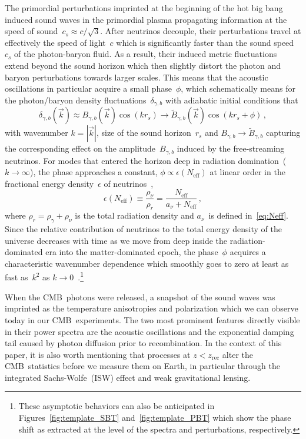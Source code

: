 \documentclass[11pt]{article}
\numberwithin{equation}{section}
\newcommand{\Neff}{N_\mathrm{eff}}
\begin{document}
The primordial perturbations imprinted at the beginning of the hot big bang induced sound waves in the primordial plasma propagating information at the speed of sound~$c_s \approx c/\sqrt{3}$. After neutrinos decouple, their perturbations travel at effectively the speed of light~$c$ which is significantly faster than the sound speed~$c_s$ of the photon-baryon fluid. As a result, their induced metric fluctuations extend beyond the sound horizon which then slightly distort the photon and baryon perturbations towards larger scales. This means that the acoustic oscillations in particular acquire a small phase~$\phi$, which schematically means for the photon/baryon density fluctuations~$\delta_{\gamma,b}$ with adiabatic initial conditions that
\begin{equation}
	\delta_{\gamma,b}(\vec{k}) \approx B_{\gamma,b}(\vec{k}) \cos(k r_s) \to \tilde{B}_{\gamma,b}(\vec{k}) \cos(k r_s + \phi)\, ,
\end{equation}
with wavenumber $k = |\vec{k}|$, size of the sound horizon~$r_s$ and $B_{\gamma,b} \to \tilde{B}_{\gamma,b}$ capturing the corresponding effect on the amplitude~$B_{\gamma,b}$ induced by the free-streaming neutrinos. For modes that entered the horizon deep in radiation domination~($k \to \infty$), the phase approaches a constant, $\phi \propto \epsilon(\Neff)$ at linear order in the fractional energy density~$\epsilon$ of neutrinos~\cite{Bashinsky:2003tk, Baumann:2015rya},
\begin{equation}
	\epsilon(\Neff) \equiv \frac{\rho_\nu}{\rho_r} = \frac{\Neff}{a_\nu + \Neff} \, ,	\label{eq:fractional_density}
\end{equation}
where $\rho_r = \rho_\gamma + \rho_\nu$ is the total radiation density and $a_\nu$~is defined in~\eqref{eq:Neff}. Since the relative contribution of neutrinos to the total energy density of the universe decreases with time as we move from deep inside the radiation-dominated era into the matter-dominated epoch, the phase~$\phi$ acquires a characteristic wavenumber dependence which smoothly goes to zero at least as fast as~$k^2$ as $k \to 0$~\cite{Baumann:2015rya}.\footnote{These asymptotic behaviors can also be anticipated in Figures~\ref{fig:template_SBT} and~\ref{fig:template_PBT} which show the phase shift as extracted at the level of the spectra and perturbations, respectively.}\medskip

When the CMB~photons were released, a snapshot of the sound waves was imprinted as the temperature anisotropies and polarization which we can observe today in our CMB~experiments. The two most prominent features directly visible in their power spectra are the acoustic oscillations and the exponential damping tail caused by photon diffusion prior to recombination. In the context of this paper, it is also worth mentioning that processes at $z < z_\mathrm{rec}$ alter the CMB~statistics before we measure them on Earth, in particular through the integrated Sachs-Wolfe~(ISW) effect and weak gravitational lensing.
\end{document}
